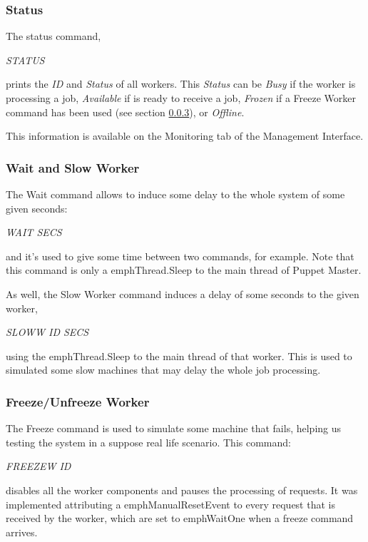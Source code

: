 \documentclass[times, 10pt,twocolumn]{article}
\begin{document}
            \subsubsection{Status}
            
            The status command,  
            
            \emph{STATUS}
            
            prints the \emph{ID} and \emph{Status} of all workers. This \emph{Status} can be  \emph{Busy} if the worker is processing a job, \emph{Available} if is ready to receive a job, \emph{Frozen} if a Freeze Worker command has been used (see section \ref{freeze}), or \emph{Offline}.
            
            This information is available on the Monitoring tab of the Management Interface. 
                   	
            \subsubsection{Wait and Slow Worker}
			The Wait command allows to induce some delay to the whole system of some given seconds:
            
            \emph{WAIT SECS}
            
            and it's used to give some time between two commands, for example. Note that this command is only a emph{Thread.Sleep} to the main thread of Puppet Master. 
            
            As well, the Slow Worker command induces a delay of some seconds to the given worker, 
            
            \emph{SLOWW ID SECS}
            
			using the emph{Thread.Sleep} to the main thread of that worker. This is used to simulated some slow machines that may delay the whole job processing.
            
            \subsubsection{Freeze/Unfreeze Worker} \label{freeze}
            The Freeze command is used to simulate some machine that fails, helping us testing the system in a suppose real life scenario. This command: 
            
            \emph{FREEZEW ID}
            
            disables all the worker components and pauses the processing of requests.
            It was implemented attributing a emph{ManualResetEvent} to every request that is received by the worker, which are set to emph{WaitOne} when a freeze command arrives.
            
\end{document}
